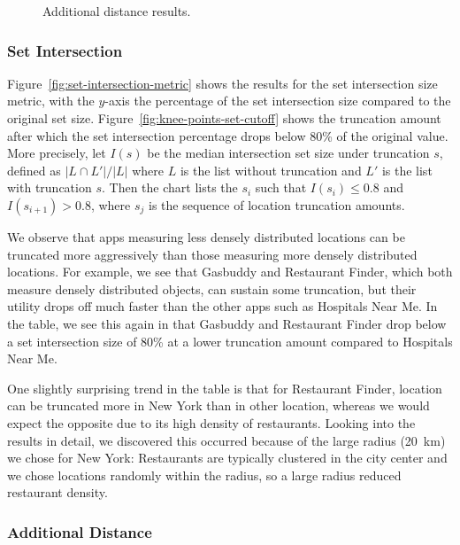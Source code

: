 \begin{figure}[t!]
\begin{subfigure}[t]{\textwidth}
  \end{subfigure}

\caption{Additional distance results.}
  
\end{figure}

\subsubsection{Set Intersection}

Figure~\ref{fig:set-intersection-metric} shows the results for the set
intersection size metric, with the $y$-axis the percentage of the set
intersection size compared to the original set size.
Figure~\ref{fig:knee-points-set-cutoff} shows the truncation amount
after which the set intersection percentage drops below 80\% of the
original value.  More precisely, let $I(s)$ be the median intersection
set size under truncation $s$, defined as $|L \cap L'|/|L|$ where $L$
is the list without truncation and $L'$ is the list with truncation
$s$. Then the chart lists the $s_i$ such that $I(s_i) \leq 0.8$ and
$I(s_{i+1}) > 0.8$, where $s_j$ is the sequence of location truncation amounts.

We observe that apps measuring less densely distributed locations can
be truncated more aggressively than those measuring more densely
distributed locations.
For example, we see that Gasbuddy and Restaurant Finder,
which both measure densely distributed objects,
can sustain some truncation, but their utility drops off much faster than the
other apps such as Hospitals Near Me. In the table, we see this again
in that Gasbuddy and Restaurant Finder drop
below a set intersection size of 80\% at a lower truncation amount compared to Hospitals Near Me.

One slightly surprising trend in the table is that for Restaurant
Finder, location can be truncated more in New York than in other
location, whereas we would expect the opposite due to its
high density of restaurants. Looking into the results in detail, we
discovered this occurred because of the large radius (20~km) we chose
for New York: Restaurants are
typically clustered in the city center and we chose
locations randomly within the radius, so a large radius reduced restaurant
density.

\subsubsection{Additional Distance}

